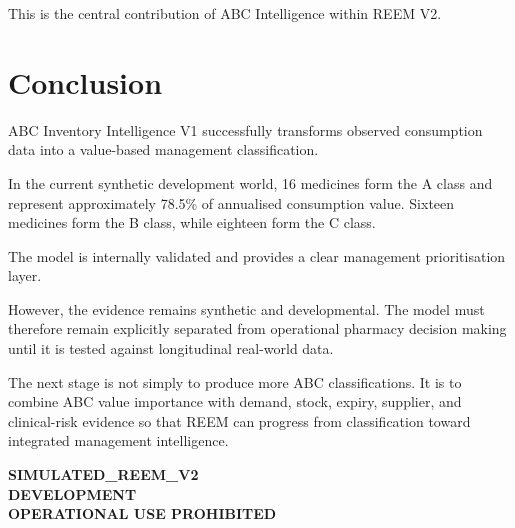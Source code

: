 \documentclass[12pt]{article}
\begin{document}
\begin{center}
\end{center}

This is the central contribution of ABC Intelligence within REEM V2.

\section{Conclusion}

ABC Inventory Intelligence V1 successfully transforms observed consumption
data into a value-based management classification.

In the current synthetic development world, 16 medicines form the A class and
represent approximately 78.5\% of annualised consumption value. Sixteen
medicines form the B class, while eighteen form the C class.

The model is internally validated and provides a clear management
prioritisation layer.

However, the evidence remains synthetic and developmental. The model must
therefore remain explicitly separated from operational pharmacy decision
making until it is tested against longitudinal real-world data.

The next stage is not simply to produce more ABC classifications. It is to
combine ABC value importance with demand, stock, expiry, supplier, and
clinical-risk evidence so that REEM can progress from classification toward
integrated management intelligence.

\vfill

\begin{tcolorbox}[
    colback=titleColor!5,
    colframe=titleColor,
    title=\textbf{REEM V2 Evidence Boundary},
    breakable
]
\centering
\textbf{SIMULATED\_REEM\_V2}\\
\textbf{DEVELOPMENT}\\
\textbf{OPERATIONAL USE PROHIBITED}
\end{tcolorbox}
\end{document}
